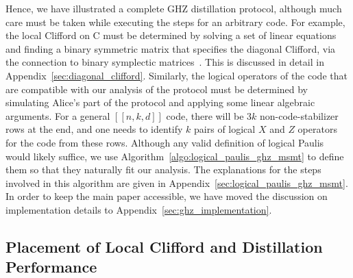 \documentclass[journal,onecolumn]{IEEEtran}
\newcommand{\llbr}{[\![}
\newcommand{\rrbr}{]\!]}
\begin{document}
Hence, we have illustrated a complete GHZ distillation protocol, although much care must be taken while executing the steps for an arbitrary code.
For example, the local Clifford on C must be determined by solving a set of linear equations and finding a binary symmetric matrix that specifies the diagonal Clifford, via the connection to binary symplectic matrices~\cite{Dehaene-physreva03,Rengaswamy-tqe20}.
This is discussed in detail in Appendix~\ref{sec:diagonal_clifford}.
Similarly, the logical operators of the code that are compatible with our analysis of the protocol must be determined by simulating Alice's part of the protocol and applying some linear algebraic arguments. %
For a general $\llbr n,k,d \rrbr$ code, there will be $3k$ non-code-stabilizer rows at the end, and one needs to identify $k$ pairs of logical $X$ and $Z$ operators for the code from these rows.
Although any valid definition of logical Paulis would likely suffice, we use Algorithm~\ref{algo:logical_paulis_ghz_msmt} to define them so that they naturally fit our analysis.
The explanations for the steps involved in this algorithm are given in Appendix~\ref{sec:logical_paulis_ghz_msmt}.
In order to keep the main paper accessible, we have moved the discussion on implementation details to Appendix~\ref{sec:ghz_implementation}.






\subsection{Placement of Local Clifford and Distillation Performance}
\label{sec:local_clifford}
\end{document}
